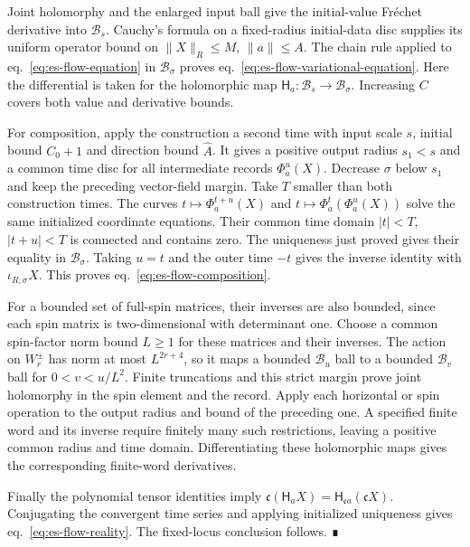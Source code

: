 \documentclass[
  english,
  11pt,
  reqno]{amsart}
\begin{document}
Joint holomorphy and the enlarged input ball give the initial-value
Fréchet derivative into \(\mathcal B_s\). Cauchy's formula on a
fixed-radius initial-data disc supplies its uniform operator bound on
\(\|X\|_R\le M\), \(\|a\|\le A\). The chain rule applied to
eq.~\ref{eq:es-flow-equation} in \(\mathcal B_\sigma\) proves
eq.~\ref{eq:es-flow-variational-equation}. Here the differential is
taken for the holomorphic map
\(\mathsf H_a:\mathcal B_s\to\mathcal B_\sigma\). Increasing \(C\)
covers both value and derivative bounds.

For composition, apply the construction a second time with input scale
\(s\), initial bound \(C_0+1\) and direction bound \(\widehat A\). It
gives a positive output radius \(s_1<s\) and a common time disc for all
intermediate records \(\Phi_a^u(X)\). Decrease \(\sigma\) below \(s_1\)
and keep the preceding vector-field margin. Take \(T\) smaller than both
construction times. The curves \(t\mapsto\Phi_a^{t+u}(X)\) and
\(t\mapsto\Phi_a^t(\Phi_a^u(X))\) solve the same initialized coordinate
equations. Their common time domain \(|t|<T\), \(|t+u|<T\) is connected
and contains zero. The uniqueness just proved gives their equality in
\(\mathcal B_\sigma\). Taking \(u=t\) and the outer time \(-t\) gives
the inverse identity with \(\iota_{R,\sigma}X\). This proves
eq.~\ref{eq:es-flow-composition}.

For a bounded set of full-spin matrices, their inverses are also
bounded, since each spin matrix is two-dimensional with determinant one.
Choose a common spin-factor norm bound \(L\ge1\) for these matrices and
their inverses. The action on \(W_r^\pm\) has norm at most \(L^{2r+4}\),
so it maps a bounded \(\mathcal B_u\) ball to a bounded \(\mathcal B_v\)
ball for \(0<v<u/L^2\). Finite truncations and this strict margin prove
joint holomorphy in the spin element and the record. Apply each
horizontal or spin operation to the output radius and bound of the
preceding one. A specified finite word and its inverse require finitely
many such restrictions, leaving a positive common radius and time
domain. Differentiating these holomorphic maps gives the corresponding
finite-word derivatives.

Finally the polynomial tensor identities imply
\(\mathfrak c(\mathsf H_aX)=\mathsf H_{\mathfrak ca}(\mathfrak cX)\).
Conjugating the convergent time series and applying initialized
uniqueness gives eq.~\ref{eq:es-flow-reality}. The fixed-locus
conclusion follows. ∎

\protect{}\label{sec:es-realization}
\end{document}
